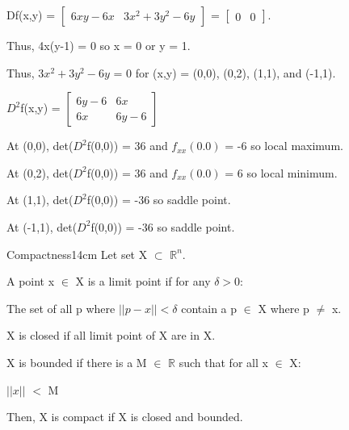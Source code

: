     \begin{tbox}
        Df(x,y)
        = $\begin{bmatrix}
            6xy - 6x
            & 3x^2 + 3y^2 - 6y
        \end{bmatrix}$
        = $\begin{bmatrix}
            0 & 0 
        \end{bmatrix}$.

        Thus, 4x(y-1) = 0 so x = 0 or y = 1.

        Thus, $3x^2 + 3y^2 - 6y$ = 0 for (x,y) = (0,0), (0,2), (1,1), and (-1,1).

        $D^2$f(x,y)
        = $\begin{bmatrix}
            6y - 6 & 6x \\
            6x & 6y - 6
        \end{bmatrix}$

        At (0,0), det($D^2$f(0,0)) = 36 and $f_{xx}(0.0)$ = -6
        so local maximum.

        At (0,2), det($D^2$f(0,0)) = 36 and $f_{xx}(0.0)$ = 6
        so local minimum.

        At (1,1), det($D^2$f(0,0)) = -36 so saddle point.

        At (-1,1), det($D^2$f(0,0)) = -36 so saddle point.
    \end{tbox}

    \vspace{0.5cm}



    \begin{definition}{Compactness}{14cm}
        Let set X $\subset$ $\mathbb{R}^n$.

        \vspace{0.3cm}

        A point x $\in$ X is a {\color{lblue} limit point}
        if for any $\delta > 0$:
        
        \hspace{0.5cm}
        The set of all p where $||p-x|| < \delta$
        contain a p $\in$ X where p $\not =$ x.

        X is closed if all limit point of X are in X.

        \vspace{0.3cm}

        X is {\color{lblue} bounded} if there is a M $\in$ $\mathbb{R}$
        such that for all x $\in$ X:

        \hspace{0.5cm}
        $||x||$ $<$ M

        \vspace{0.5cm}

        Then, X is {\color{lblue} compact} if X is closed and bounded.
    \end{definition}

